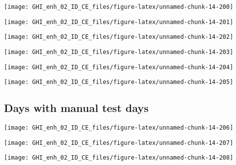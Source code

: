 \documentclass[
  10pt,
  a4paper,oneside]{article}
\begin{document}
\begin{center}\texttt{[image: GHI\_enh\_02\_ID\_CE\_files/figure-latex/unnamed-chunk-14-200]} \end{center}

\begin{center}\texttt{[image: GHI\_enh\_02\_ID\_CE\_files/figure-latex/unnamed-chunk-14-201]} \end{center}

\begin{center}\texttt{[image: GHI\_enh\_02\_ID\_CE\_files/figure-latex/unnamed-chunk-14-202]} \end{center}

\begin{center}\texttt{[image: GHI\_enh\_02\_ID\_CE\_files/figure-latex/unnamed-chunk-14-203]} \end{center}

\begin{center}\texttt{[image: GHI\_enh\_02\_ID\_CE\_files/figure-latex/unnamed-chunk-14-204]} \end{center}

\begin{center}\texttt{[image: GHI\_enh\_02\_ID\_CE\_files/figure-latex/unnamed-chunk-14-205]} \end{center}

\FloatBarrier

\hypertarget{days-with-manual-test-days}{%
\subsection{Days with manual test days}\label{days-with-manual-test-days}}

\begin{center}\texttt{[image: GHI\_enh\_02\_ID\_CE\_files/figure-latex/unnamed-chunk-14-206]} \end{center}

\begin{center}\texttt{[image: GHI\_enh\_02\_ID\_CE\_files/figure-latex/unnamed-chunk-14-207]} \end{center}

\begin{center}\texttt{[image: GHI\_enh\_02\_ID\_CE\_files/figure-latex/unnamed-chunk-14-208]} \end{center}

\newpage
\FloatBarrier
\end{document}

